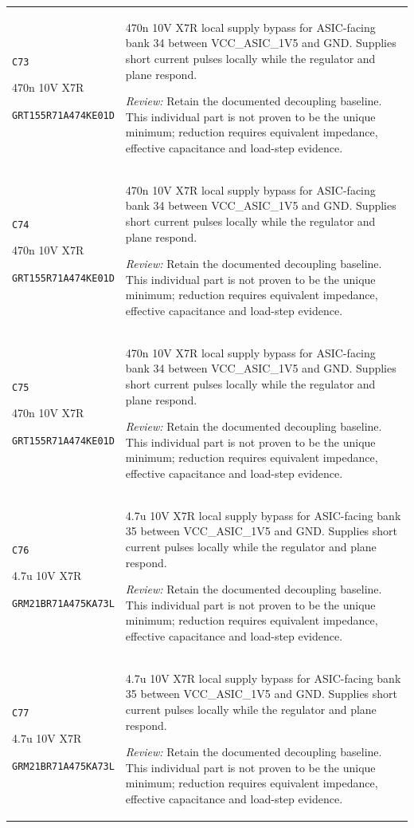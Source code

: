 \documentclass[10pt,a4paper]{article}
\begin{document}
\begin{longtable}{@{}P{46mm}P{117mm}@{}}
\nolinkurl{C73}\par 470n 10V X7R\par\scriptsize \nolinkurl{GRT155R71A474KE01D} & 470n 10V X7R local supply bypass for ASIC-facing bank 34 between VCC\_ASIC\_1V5 and GND. Supplies short current pulses locally while the regulator and plane respond.\par\smallskip\textit{Review:} Retain the documented decoupling baseline. This individual part is not proven to be the unique minimum; reduction requires equivalent impedance, effective capacitance and load-step evidence. \\
\nolinkurl{C74}\par 470n 10V X7R\par\scriptsize \nolinkurl{GRT155R71A474KE01D} & 470n 10V X7R local supply bypass for ASIC-facing bank 34 between VCC\_ASIC\_1V5 and GND. Supplies short current pulses locally while the regulator and plane respond.\par\smallskip\textit{Review:} Retain the documented decoupling baseline. This individual part is not proven to be the unique minimum; reduction requires equivalent impedance, effective capacitance and load-step evidence. \\
\nolinkurl{C75}\par 470n 10V X7R\par\scriptsize \nolinkurl{GRT155R71A474KE01D} & 470n 10V X7R local supply bypass for ASIC-facing bank 34 between VCC\_ASIC\_1V5 and GND. Supplies short current pulses locally while the regulator and plane respond.\par\smallskip\textit{Review:} Retain the documented decoupling baseline. This individual part is not proven to be the unique minimum; reduction requires equivalent impedance, effective capacitance and load-step evidence. \\
\nolinkurl{C76}\par 4.7u 10V X7R\par\scriptsize \nolinkurl{GRM21BR71A475KA73L} & 4.7u 10V X7R local supply bypass for ASIC-facing bank 35 between VCC\_ASIC\_1V5 and GND. Supplies short current pulses locally while the regulator and plane respond.\par\smallskip\textit{Review:} Retain the documented decoupling baseline. This individual part is not proven to be the unique minimum; reduction requires equivalent impedance, effective capacitance and load-step evidence. \\
\nolinkurl{C77}\par 4.7u 10V X7R\par\scriptsize \nolinkurl{GRM21BR71A475KA73L} & 4.7u 10V X7R local supply bypass for ASIC-facing bank 35 between VCC\_ASIC\_1V5 and GND. Supplies short current pulses locally while the regulator and plane respond.\par\smallskip\textit{Review:} Retain the documented decoupling baseline. This individual part is not proven to be the unique minimum; reduction requires equivalent impedance, effective capacitance and load-step evidence. \\

\end{longtable}
\end{document}
